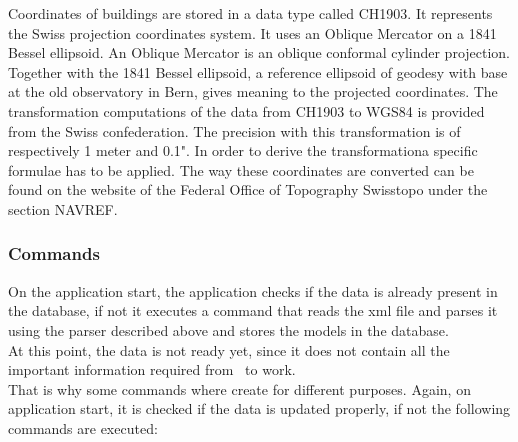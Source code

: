 Coordinates of buildings are stored in a data type called CH1903. It represents the Swiss projection coordinates system. It uses an Oblique Mercator on a 1841 Bessel ellipsoid. An Oblique Mercator is an oblique conformal cylinder projection. Together with the 1841 Bessel ellipsoid, a reference ellipsoid of geodesy with base at the old observatory in Bern, gives meaning to the projected coordinates. The transformation computations of the data from CH1903 to WGS84 is provided from the Swiss confederation. The precision with this transformation is of respectively 1 meter and 0.1". In order to derive the transformationa specific formulae has to be applied. The way these coordinates are converted can be found on the website of the Federal Office of Topography Swisstopo under the section NAVREF. 
\subsubsection{Commands}
On the application start, the application checks if the data is already present in the database, if not it executes a command that reads the xml file and parses it using the parser described above and stores the models in the database.\\  
At this point, the data is not ready yet, since it does not contain all the important information required from \applicationName\ to work.\\
That is why some commands where create for different purposes. Again, on application start, it is checked if the data is updated properly, if not the following commands are executed:
